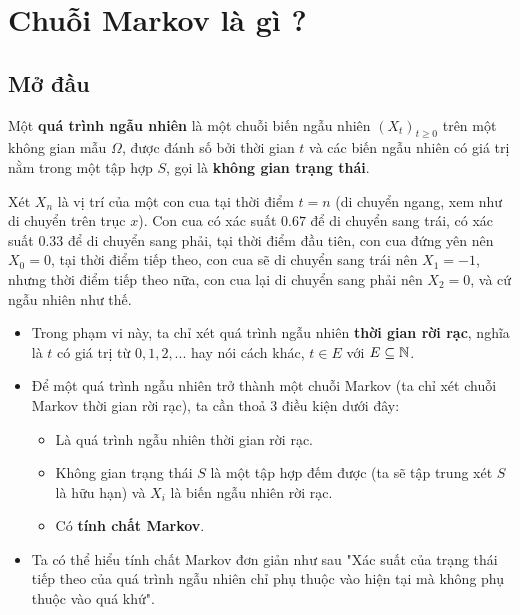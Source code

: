 \chapter{Chuỗi Markov là gì ?}

\section{Mở đầu}
\begin{defivn}
    Một \textbf{quá trình ngẫu nhiên} là một chuỗi biến ngẫu nhiên $(X_t)_{t \geq 0}$ trên một không gian mẫu $\Omega$, được đánh số bởi thời gian $t$ và các biến ngẫu nhiên có giá trị nằm trong một tập hợp $S$, gọi là \textbf{không gian trạng thái}.
\end{defivn}
\vspace{5pt}

\begin{egvn}
    Xét $X_n$ là vị trí của một con cua tại thời điểm $t = n$ (di chuyển ngang, xem như di chuyển trên trục $x$). Con cua có xác suất $0.67$ để di chuyển sang trái, có xác suất $0.33$ để di chuyển sang phải, tại thời điểm đầu tiên, con cua đứng yên nên $X_0 = 0$, tại thời điểm tiếp theo, con cua sẽ di chuyển sang trái nên $X_1 = -1$, nhưng thời điểm tiếp theo nữa, con cua lại di chuyển sang phải nên $X_2 = 0$, và cứ ngẫu nhiên như thế.
\end{egvn}

\begin{itemize}
    \item Trong phạm vi này, ta chỉ xét quá trình ngẫu nhiên \textbf{thời gian rời rạc}, nghĩa là $t$ có giá trị từ $0, 1, 2, ...$ hay nói cách khác, $t \in E$ với $E \subseteq \mathbb{N}$.
    
    \item Để một quá trình ngẫu nhiên trở thành một chuỗi Markov (ta chỉ xét chuỗi Markov thời gian rời rạc), ta cần thoả 3 điều kiện dưới đây:
    \begin{itemize}
        \item Là quá trình ngẫu nhiên thời gian rời rạc.
        \item Không gian trạng thái $S$ là một tập hợp đếm được (ta sẽ tập trung xét $S$ là hữu hạn) và $X_i$ là biến ngẫu nhiên rời rạc.
        \item Có \textbf{tính chất Markov}.
    \end{itemize}

    \item Ta có thể hiểu tính chất Markov đơn giản như sau "Xác suất của trạng thái tiếp theo của quá trình ngẫu nhiên chỉ phụ thuộc vào hiện tại mà không phụ thuộc vào quá khứ".
\end{itemize}

